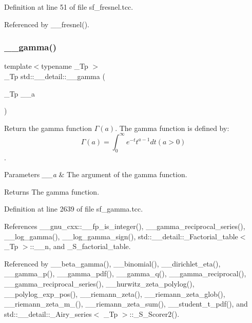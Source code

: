 Definition at line 51 of file sf\+\_\+fresnel.\+tcc.



Referenced by \+\_\+\+\_\+fresnel().

\mbox{\label{namespacestd_1_1____detail_a178e0b2cc0ae66b7d958e837da4fe4c1}} 
\subsubsection{\texorpdfstring{\+\_\+\+\_\+gamma()}{\_\_gamma()}\hspace{0.1cm}{\footnotesize\ttfamily [1/2]}}
{\footnotesize\ttfamily template$<$typename \+\_\+\+Tp $>$ \\
\+\_\+\+Tp std\+::\+\_\+\+\_\+detail\+::\+\_\+\+\_\+gamma (\begin{DoxyParamCaption}\item[{\+\_\+\+Tp}]{\+\_\+\+\_\+a }\end{DoxyParamCaption})}



Return the gamma function $ \Gamma(a) $. The gamma function is defined by\+: \[ \Gamma(a) = \int_0^\infty e^{-t}t^{a-1}dt (a > 0) \]. 


\begin{DoxyParams}{Parameters}
{\em \+\_\+\+\_\+a} & The argument of the gamma function. \\
\hline
\end{DoxyParams}
\begin{DoxyReturn}{Returns}
The gamma function. 
\end{DoxyReturn}


Definition at line 2639 of file sf\+\_\+gamma.\+tcc.



References \+\_\+\+\_\+gnu\+\_\+cxx\+::\+\_\+\+\_\+fp\+\_\+is\+\_\+integer(), \+\_\+\+\_\+gamma\+\_\+reciprocal\+\_\+series(), \+\_\+\+\_\+log\+\_\+gamma(), \+\_\+\+\_\+log\+\_\+gamma\+\_\+sign(), std\+::\+\_\+\+\_\+detail\+::\+\_\+\+Factorial\+\_\+table$<$ \+\_\+\+Tp $>$\+::\+\_\+\+\_\+n, and \+\_\+\+S\+\_\+factorial\+\_\+table.



Referenced by \+\_\+\+\_\+beta\+\_\+gamma(), \+\_\+\+\_\+binomial(), \+\_\+\+\_\+dirichlet\+\_\+eta(), \+\_\+\+\_\+gamma\+\_\+p(), \+\_\+\+\_\+gamma\+\_\+pdf(), \+\_\+\+\_\+gamma\+\_\+q(), \+\_\+\+\_\+gamma\+\_\+reciprocal(), \+\_\+\+\_\+gamma\+\_\+reciprocal\+\_\+series(), \+\_\+\+\_\+hurwitz\+\_\+zeta\+\_\+polylog(), \+\_\+\+\_\+polylog\+\_\+exp\+\_\+pos(), \+\_\+\+\_\+riemann\+\_\+zeta(), \+\_\+\+\_\+riemann\+\_\+zeta\+\_\+glob(), \+\_\+\+\_\+riemann\+\_\+zeta\+\_\+m\+\_(), \+\_\+\+\_\+riemann\+\_\+zeta\+\_\+sum(), \+\_\+\+\_\+student\+\_\+t\+\_\+pdf(), and std\+::\+\_\+\+\_\+detail\+::\+\_\+\+Airy\+\_\+series$<$ \+\_\+\+Tp $>$\+::\+\_\+\+S\+\_\+\+Scorer2().


